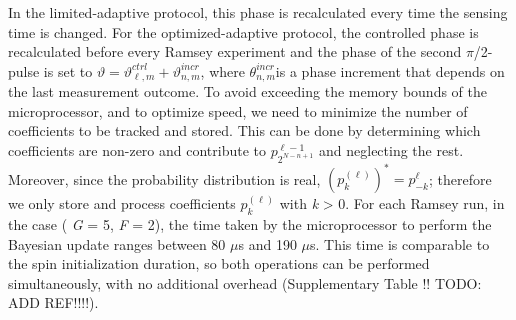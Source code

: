 In the limited-adaptive protocol, this phase is recalculated every time the sensing time is changed. For the optimized-adaptive protocol, the controlled phase is recalculated before every Ramsey experiment and the phase of the second $\pi$/2-pulse is set to $\vartheta = \vartheta_{\ell,m}^{ctrl} + \vartheta_{n,m}^{incr}$, where $\theta_{n,m}^{incr}$is a phase increment that depends on the last measurement outcome\cite{Hayes_Phys.Rev.A_2014}.
To avoid exceeding the memory bounds of the microprocessor, and to optimize speed, we need to minimize the number of coefficients to be tracked and stored. This can be done by determining which coefficients are non-zero and contribute to $p_{2^{N-n+1}}^{\ell - 1}$ and neglecting the rest. Moreover, since the probability distribution is real, $(p_{k}^{(\ell)})^*=p_{-k}^{\ell}$; therefore we only store and process coefficients $p_{k}^{(\ell)}$ with \textit{k} > 0.
For each Ramsey run, in the case ( \textit{G} = 5, \textit{F} = 2), the time taken by the microprocessor to perform the Bayesian update ranges between 80 $\mu$s and 190 $\mu$s. This time is comparable to the spin initialization duration, so both operations can be performed simultaneously, with no additional overhead (Supplementary Table !! TODO: ADD REF!!!!).




\clearpage



